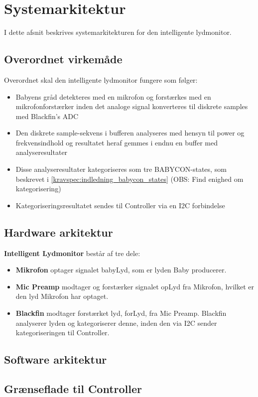 \section{Systemarkitektur}

I dette afsnit beskrives systemarkitekturen for den intelligente lydmonitor.

\subsection*{Overordnet virkemåde}
Overordnet skal den intelligente lydmonitor fungere som følger:
\begin{itemize}
	\item Babyens gråd detekteres med en mikrofon og forstærkes med en mikrofonforstærker inden det analoge signal konverteres til diskrete samples med Blackfin's ADC
	\item Den diskrete sample-sekvens i bufferen analyseres med hensyn til power og frekvensindhold og resultatet heraf gemmes i endnu en buffer med analyseresultater
	\item Disse analyseresultater kategoriseres som tre BABYCON-states, som beskrevet i \ref{kravspec:indledning_babycon_states} (OBS: Find enighed om kategorisering)
	\item Kategoriseringsresultatet sendes til Controller via en I2C forbindelse
\end{itemize}


\newpage
\subsection*{Hardware arkitektur}

\textbf{Intelligent Lydmonitor} består af tre dele: 
\begin{itemize}
\item \textbf{Mikrofon} optager signalet babyLyd, som er lyden Baby producerer. 
\item \textbf{Mic Preamp} modtager og forstærker signalet opLyd fra Mikrofon, hvilket er den lyd Mikrofon har optaget. 
\item \textbf{Blackfin} modtager forstærket lyd, forLyd, fra Mic Preamp. Blackfin analyserer lyden og kategoriserer denne, inden den via I2C sender kategoriseringen til Controller. 
\end{itemize}

\newpage
\subsection*{Software arkitektur}




\subsection*{Grænseflade til Controller}